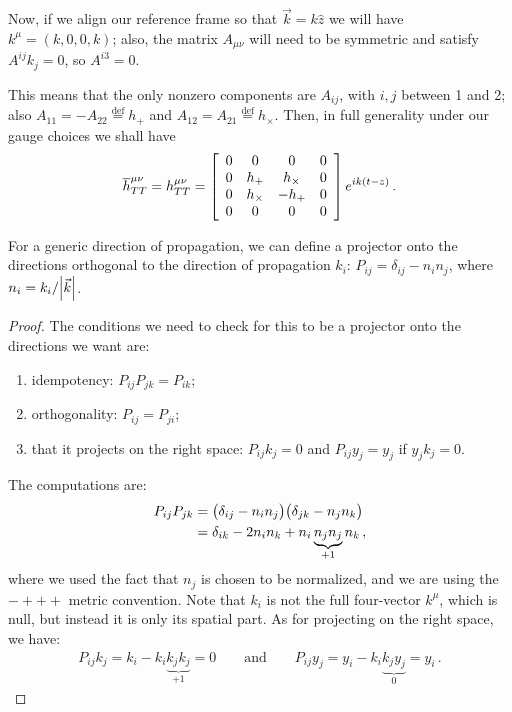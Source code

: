 \documentclass[main.tex]{subfiles}
\begin{document}
Now, if we align our reference frame so that \(\vec{k} = k \hat{z}\) we will have \(k^{\mu } = (k, 0, 0, k)\); also, the matrix \(A_{\mu \nu }\) will need to be symmetric and satisfy \(A^{ij}k_{j} = 0\), so \(A^{i3}=0\).

This means that the only nonzero components are \(A_{ij}\), with \(i, j\) between 1 and 2; also \(A_{11} = - A_{22} \overset{\text{def}}{=} h_+\) and \(A_{12} = A_{21} \overset{\text{def}}{=} h_{ \times }\).
Then, in full generality under our gauge choices we shall have 
%
\begin{subequations}
\begin{align}
\overline{h}^{\mu \nu }_{TT} =
h^{\mu \nu }_{TT} = 
\left[\begin{array}{cccc}
0 & 0 & 0 & 0 \\ 
0 & h_{+} & h_{ \times } & 0 \\ 
0 & h_{ \times } & - h_{+} & 0 \\ 
0 & 0 & 0 & 0
\end{array}\right]
e^{i k \qty(t -z)}
\,.
\end{align}
\end{subequations}

\begin{claim}
For a generic direction of propagation, we can define a projector onto the directions orthogonal to the direction of propagation \(k_{i}\): \(P_{ij} = \delta_{ij} - n_i n_j\), where \(n_i = k_i / \abs{\vec{k}}\).
\end{claim}

\begin{proof}
The conditions we need to check for this to be a projector onto the directions we want are: 
\begin{enumerate}
    \item idempotency: \(P_{ij} P_{jk} = P_{ik}\);
    \item orthogonality: \(P_{ij} = P_{ji}\);
    \item that it projects on the right space: \(P_{ij} k_{j} = 0\) and \(P_{ij} y_{j} = y_{j}\) if \(y_{j} k_{j} = 0\).
\end{enumerate}

The computations are: 
%
\begin{align}
P_{ij} P_{jk} &= \qty(\delta_{ij} - n_i n_j)
\qty(\delta_{jk} - n_j n_k)  \\
&= \delta_{ik} - 2 n_i n_k + n_i \underbrace{n_j n_j}_{+1} n_k 
\,,
\end{align}
%
where we used the fact that \(n_j\) is chosen to be normalized, and we are using the \(- +++\) metric convention. Note that \(k_i\) is not the full four-vector \(k^{\mu }\), which is null, but instead it is only its spatial part. 
As for projecting on the right space, we have:
%
\begin{align}
P_{ij} k_j = k_i - k_i \underbrace{k_j k_j}_{+1} = 0
\qquad \text{and} \qquad
P_{ij} y_j = y_i - k_i \underbrace{k_j y_j}_{0} = y_i    
\,.
\end{align}
\end{proof}
\end{document}
